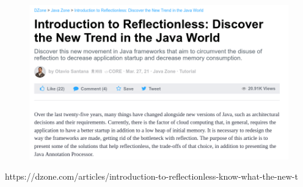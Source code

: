 \documentclass[aspectratio=169]{beamer}
\begin{document}
\begin{frame}{}
	\begin{figure}
		\centering
		\includegraphics[width=0.8\linewidth]{Images/otavio}
	\end{figure}
{\tiny https://dzone.com/articles/introduction-to-reflectionless-know-what-the-new-t}
\end{frame}
\end{document}
